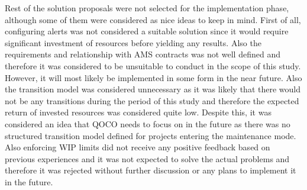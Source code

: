 Rest of the solution proposals were not selected for the implementation phase, although some of them were considered as nice ideas to keep in mind. First of all, configuring
alerts was not considered a suitable solution since it would require significant investment of resources before yielding any results. Also the requirements and relationship
with AMS contracts was not well defined and therefore it was considered to be unsuitable to conduct in the scope of this study. However, it will most likely be implemented
in some form in the near future. Also the transition model was considered unnecessary as it was likely that there would not be any transitions during the period of this study
and therefore the expected return of invested resources was considered quite low. Despite this, it was considered an idea that QOCO needs to focus on in the future as there
was no structured transition model defined for projects entering the maintenance mode. Also enforcing WIP limits did not receive any positive feedback based on previous experiences
and it was not expected to solve the actual problems and therefore it was rejected without further discussion or any plans to implement it in the future.
